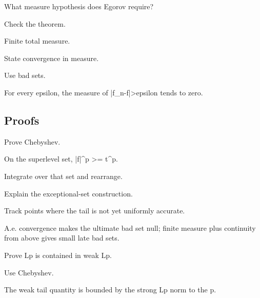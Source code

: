 \begin{exercise}\label{exr:iii08-expand-04}
What measure hypothesis does Egorov require?
\end{exercise}
\begin{hint}
Check the theorem.
\end{hint}
\begin{solution}
Finite total measure.
\end{solution}

\begin{exercise}\label{exr:iii08-expand-05}
State convergence in measure.
\end{exercise}
\begin{hint}
Use bad sets.
\end{hint}
\begin{solution}
For every epsilon, the measure of |f\_n-f|>epsilon tends to zero.
\end{solution}

\subsection*{Proofs}

\begin{exercise}\label{exr:iii08-expand-06}
Prove Chebyshev.
\end{exercise}
\begin{hint}
On the superlevel set, |f|\textasciicircum{}p >= t\textasciicircum{}p.
\end{hint}
\begin{solution}
Integrate over that set and rearrange.
\end{solution}

\begin{exercise}\label{exr:iii08-expand-07}
Explain the exceptional-set construction.
\end{exercise}
\begin{hint}
Track points where the tail is not yet uniformly accurate.
\end{hint}
\begin{solution}
A.e. convergence makes the ultimate bad set null; finite measure plus continuity from above gives small late bad sets.
\end{solution}

\begin{exercise}\label{exr:iii08-expand-08}
Prove Lp is contained in weak Lp.
\end{exercise}
\begin{hint}
Use Chebyshev.
\end{hint}
\begin{solution}
The weak tail quantity is bounded by the strong Lp norm to the p.
\end{solution}

